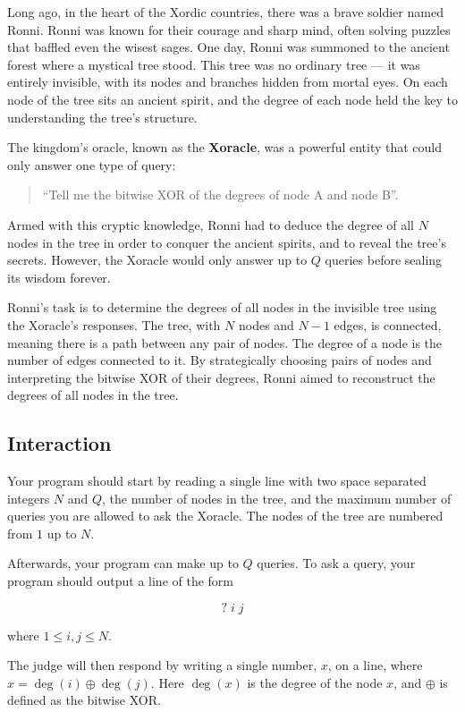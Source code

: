 
Long ago, in the heart of the Xordic countries, there was a brave soldier named Ronni.
Ronni was known for their courage and sharp mind, often solving puzzles that baffled even the wisest sages.
One day, Ronni was summoned to the ancient forest where a mystical tree stood.
This tree was no ordinary tree --- it was entirely invisible, with its nodes and branches hidden from mortal eyes.
On each node of the tree sits an ancient spirit, and the degree of each node held the key to understanding the tree's structure.

The kingdom's oracle, known as the \textbf{Xoracle}, was a powerful entity that could only answer one type of query:

\begin{quote}
``Tell me the bitwise XOR of the degrees of node A and node B''.
\end{quote}

Armed with this cryptic knowledge, Ronni had to deduce the degree of all $N$ nodes in the tree in order to conquer the ancient spirits,
and to reveal the tree's secrets.
However, the Xoracle would only answer up to $Q$ queries before sealing its wisdom forever.

Ronni's task is to determine the degrees of all nodes in the invisible tree using the Xoracle's responses.
The tree, with $N$ nodes and $N-1$ edges, is connected, meaning there is a path between any pair of nodes.
The degree of a node is the number of edges connected to it.
By strategically choosing pairs of nodes and interpreting the bitwise XOR of their degrees,
Ronni aimed to reconstruct the degrees of all nodes in the tree.

\subsection*{Interaction}

Your program should start by reading a single line with two space separated integers $N$ and $Q$,
the number of nodes in the tree, and the maximum number of queries you are allowed to ask the Xoracle.
The nodes of the tree are numbered from $1$ up to $N$.

Afterwards, your program can make up to $Q$ queries.
To ask a query, your program should output a line of the form

$$? \; i \; j$$

where $1 \leq i, j \leq N$.

The judge will then respond by writing a single number, $x$, on a line, where $x = \deg(i) \oplus \deg(j)$.
Here $\deg(x)$ is the degree of the node $x$, and $\oplus$ is defined as the bitwise XOR.

